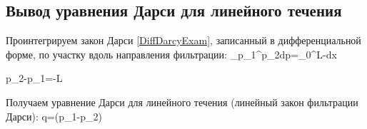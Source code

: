 

\subsection{Вывод уравнения Дарси для линейного течения}

Проинтегрируем закон Дарси \eqref{DiffDarcyExam}, записанный в дифференциальной форме, по участку вдоль направления фильтрации:
\beq
\int\limits_{p_1}^{p_2}dp=\int\limits_{0}^{L}-dx
\eeq

\beq
p_2-p_1=-L
\eeq

Получаем уравнение Дарси для линейного течения (линейный закон фильтрации Дарси):
\beq
q=\left(p_1-p_2\right)
\eeq

